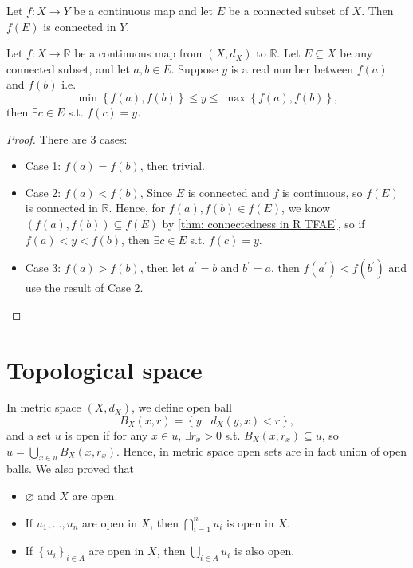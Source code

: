 \begin{theorem}
    Let \(f: X \to Y\) be a continuous map and let \(E\) be a connected subset of \(X\). Then \(f(E)\) is connected in \(Y\).     
\end{theorem}
\begin{corollary} \label{cl: Intermediate value theorem}
    Let \(f: X \to \mathbb{R} \) be a continuous map from \((X, d_X)\) to \(\mathbb{R} \). Let \(E \subseteq X\) be any connected subset, and let \(a, b \in E\). Suppose \(y\) is a real number between \(f(a)\) and \(f(b)\) i.e. 
    \[
        \min \left\{ f(a), f(b) \right\} \le y \le \max \left\{ f(a), f(b) \right\},  
    \] then \(\exists c \in E\) s.t. \(f(c) = y\).  
\end{corollary}
\begin{proof}
    There are \(3\) cases: 
    \begin{itemize}
        \item Case 1: \(f(a) = f(b)\), then trivial. 
        \item Case 2: \(f(a) < f(b)\), Since \(E\) is connected and \(f\) is continuous, so \(f(E)\) is connected in \(\mathbb{R} \). Hence, for \(f(a), f(b) \in f(E)\), we know \(\left( f(a), f(b) \right) \subseteq f(E) \) by \autoref{thm: connectedness in R TFAE}, so if \(f(a) < y < f(b)\), then \(\exists c \in E\) s.t. \(f(c) = y\).           
        \item Case 3: \(f(a) > f(b)\), then let \(a^{\prime} = b\) and \(b^{\prime} = a\), then \(f \left( a^{\prime}  \right) < f \left( b^{\prime}  \right)  \) and use the result of Case 2.
    \end{itemize} 
\end{proof}
\section{Topological space}
In metric space \((X, d_X)\), we define open ball
\[
    B_X(x, r) = \left\{ y \mid d_X (y, x) < r \right\},
\]
and a set \(u\) is open if for any \(x \in u\), \(\exists r_x > 0\) s.t. \(B_X(x, r_x) \subseteq u\), so \(u = \bigcup_{x \in u} B_X(x, r_x) \). Hence, in metric space open sets are in fact union of open balls. We also proved that 
\begin{itemize}
    \item \(\varnothing  \) and \(X\) are open. 
    \item  If \(u_1, \dots , u_n\) are open in \(X\), then \(\bigcap_{i=1}^{n} u_i \) is open in \(X\). 
    \item If \(\left\{ u_i \right\}_{i \in A} \) are open in \(X\), then \(\bigcup_{i \in A} u_{i} \) is also open.       
\end{itemize}    

